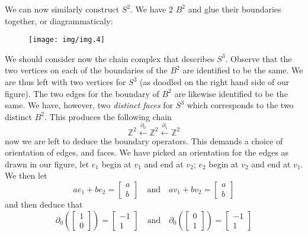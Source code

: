 We can now similarly construct $S^{2}$. We have 2 $B^{2}$ and glue their
boundaries together, or diagrammaticaly:
\begin{figure}[H]
\begin{center}
\texttt{[image: img/img.4]}
\end{center}
\end{figure}
\noindent We should consider now the chain complex that describes
$S^{3}$. Observe that the two vertices on each of the boundaries
of the $B^{2}$ are identified to be the same. We are thus left
with two vertices for $S^{3}$ (as doodled on the right hand side
of our figure). The two edges for the boundary of $B^{2}$ are
likewise identified to be the same. We have, however, two
\emph{distinct faces} for $S^{3}$ which corresponds to the two
distinct $B^{2}$. This produces the following chain
\begin{equation}%
\mathbb{Z}^{2}\xleftarrow{\partial_{0}}\mathbb{Z}^{2}\xleftarrow{\partial_{1}}\mathbb{Z}^{2}
\end{equation}
now we are left to deduce the boundary operators. This demands a
choice of orientation of edges, and faces. We have picked an
orientation for the edges as drawn in our figure, let $e_{1}$
begin at $v_{1}$ and end at $v_{2}$; $e_{2}$ begin at $v_{2}$ and
end at $v_{1}$. We then let
\begin{equation}%
ae_{1}+be_{2}=\begin{bmatrix}a\\b\end{bmatrix}\quad\text{and}\quad 
av_{1}+bv_{2}=\begin{bmatrix}a\\b\end{bmatrix}
\end{equation}
and then deduce that
\begin{equation}%
\partial_{0}\left(\begin{bmatrix}1\\0\end{bmatrix}\right)=\begin{bmatrix}-1\\1\end{bmatrix}\quad\text{and}\quad
\partial_{0}\left(\begin{bmatrix}0\\1\end{bmatrix}\right)=\begin{bmatrix}-1\\1\end{bmatrix}
\end{equation}
